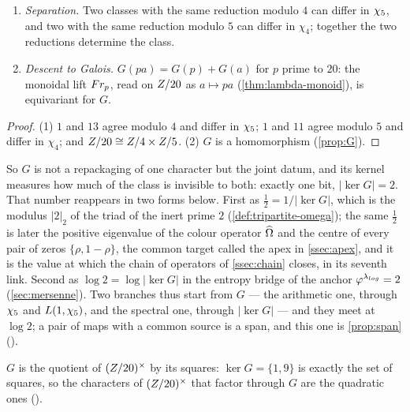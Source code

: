 \begin{proposition}\label{prop:two-registers-G}
\leavevmode
\begin{enumerate}
  \item \emph{Separation.}  Two classes with the same reduction modulo $4$ can
    differ in $\chi_5$, and two with the same reduction modulo $5$ can differ in
    $\chi_4$; together the two reductions determine the class.
  \item \emph{Descent to Galois.}  $G(pa)=G(p)+G(a)$ for $p$ prime to $20$: the monoidal lift
    $Fr_p$, read on $Z/20$ as $a\mapsto pa$ (\cref{thm:lambda-monoid}), is equivariant for $G$.
\end{enumerate}
\end{proposition}
\begin{proof}
(1) $1$ and $13$ agree modulo $4$ and differ in $\chi_5$; $1$ and $11$ agree modulo
$5$ and differ in $\chi_4$; and $Z/20\cong Z/4\times Z/5$.  (2) $G$ is a homomorphism (\cref{prop:G}).
\end{proof}

So $G$ is not a repackaging of one character but the
joint datum, and its kernel measures how much of the class is invisible to both:
exactly one bit, $|\ker G|=2$.  That number reappears in two forms below.  First as $\tfrac12=1/|\ker G|$, which is
the modulus $|2|_2$ of the triad of the inert prime $2$ (\cref{def:tripartite-omega}); the same $\tfrac12$ is later the
positive eigenvalue of the colour operator $\widehat{\Omega}$ and the centre of every pair of zeros $\{\rho,1-\rho\}$, the common
target called the apex in \cref{ssec:apex}, and it is the value at which the chain of operators of \cref{ssec:chain}
closes, in its seventh link.  Second as $\log2=\log|\ker G|$ in the entropy bridge of the anchor
$\varphi^{\lambda_{log}}=2$ (\cref{sec:mersenne}).  Two branches thus start from $G$ --- the arithmetic one, through $\chi_5$ and
$L(1,\chi_5)$, and the spectral one, through $|\ker G|$ --- and they meet at $\log2$; a pair of maps with a common source
is a span, and this one is \cref{prop:span}
().

$G$ is the quotient of $(Z/20)^{\times}$ by its squares: $\ker G=\{1,9\}$ is exactly the set of squares, so the
characters of $(Z/20)^{\times}$ that factor through $G$ are the quadratic ones
().

